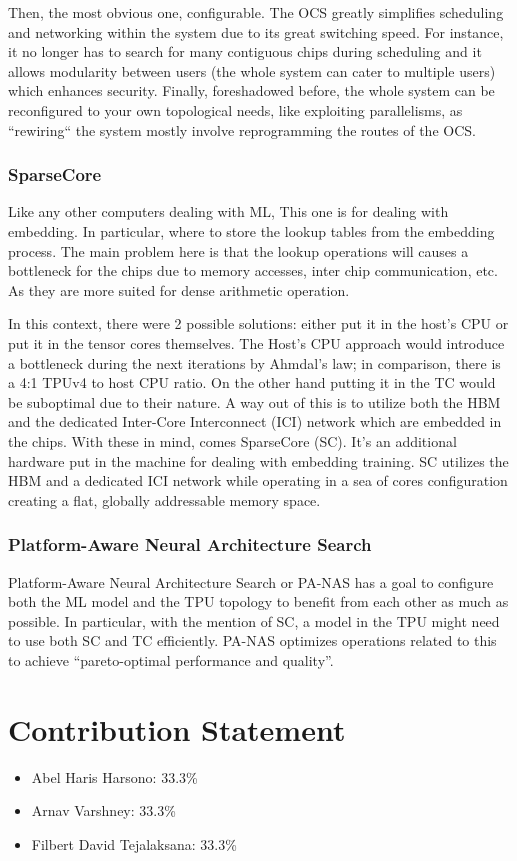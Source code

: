\documentclass[conference]{IEEEtran}
\begin{document}
    Then, the most obvious one, configurable.
    The OCS greatly simplifies scheduling and networking within the system due to its great switching speed.
    For instance, it no longer has to search for many contiguous chips during scheduling and it allows modularity between users (the whole system can cater to multiple users) which enhances security.
    Finally, foreshadowed before, the whole system can be reconfigured to your own topological needs, like exploiting parallelisms, as ``rewiring`` the system mostly involve reprogramming the routes of the OCS\@.

    \subsubsection{SparseCore}
    Like any other computers dealing with ML, This one is for dealing with embedding.
    In particular, where to store the lookup tables from the embedding process.
    The main problem here is that the lookup operations will causes a bottleneck for the chips due to memory accesses, inter chip communication, etc.
    As they are more suited for dense arithmetic operation.

    In this context, there were 2 possible solutions: either put it in the host’s CPU or put it in the tensor cores themselves.
    The Host’s CPU approach would introduce a bottleneck during the next iterations by Ahmdal’s law; in comparison, there is a 4:1 TPUv4 to host CPU ratio.
    On the other hand putting it in the TC would be suboptimal due to their nature.
    A way out of this is to utilize both the HBM and the dedicated Inter-Core Interconnect (ICI) network which are embedded in the chips.
    With these in mind, comes SparseCore (SC).
    It’s an additional hardware put in the machine for dealing with embedding training.
    SC utilizes the HBM and a dedicated ICI network while operating in a sea of cores configuration creating a flat, globally addressable memory space.

    \subsubsection{Platform-Aware Neural Architecture Search}
    Platform-Aware Neural Architecture Search or PA-NAS has a goal to configure both the ML model and the TPU topology to benefit from each other as much as possible.
    In particular, with the mention of SC, a model in the TPU might need to use both SC and TC efficiently.
    PA-NAS optimizes operations related to this to achieve “pareto-optimal performance and quality”.


    \section{Contribution Statement}
    \begin{itemize}
        \item Abel Haris Harsono: 33.3\%
        \item Arnav Varshney: 33.3\%
        \item Filbert David Tejalaksana: 33.3\%
    \end{itemize}
\end{document}

